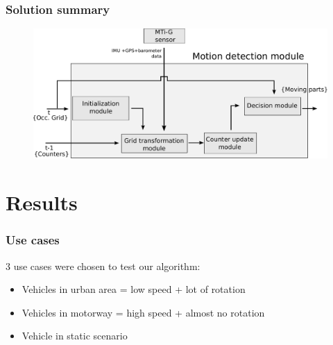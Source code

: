 \documentclass{beamer}
\begin{document}
	\begin{frame}
		\frametitle{Solution summary}
		\begin{figure}[h]
			\center
			\includegraphics[scale=0.40]{../img/fig:motion:framework:motionmodule}
		 \end{figure}
	\end{frame}	

\section{Results}

	\begin{frame}
		\frametitle{Use cases}
		3 use cases were chosen to test our algorithm:
		\begin{itemize}
		\item Vehicles in urban area =  low speed + lot of rotation
		\item Vehicles in motorway = high speed + almost no rotation
		\item Vehicle in static scenario
		\end{itemize}						
	\end{frame}
\end{document}
